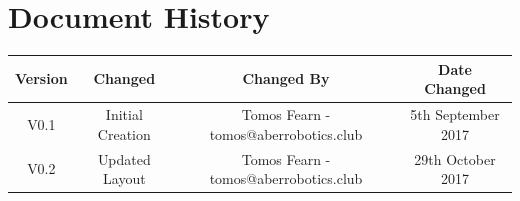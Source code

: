 \documentclass[a4paper,11pt]{article}
\begin{document}
\newpage
\section*{Document History}
\begin{center}
\begin{tabular}{ |c|c|c|c| } 
\hline
Version & Changed & Changed By & Date Changed \\
\hline
V0.1 & Initial Creation & Tomos Fearn - tomos@aberrobotics.club & 5th September 2017\\ 
\hline
V0.2 & Updated Layout & Tomos Fearn - tomos@aberrobotics.club & 29th October 2017\\
\hline
\end{tabular}
\end{center}
\end{document}
